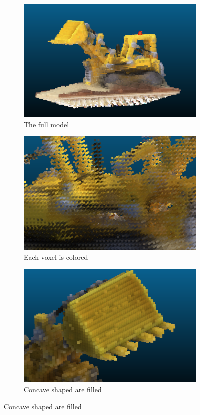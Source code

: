 \documentclass{article}
\begin{document}
\begin{figure}[!h]
 \centering
\begin{subfigure}{.32\textwidth}
  \centering
  \includegraphics[width=\linewidth]{figs/carve/legod1.png}   \caption{\label{fig:legod1} The full model}
\end{subfigure}
\begin{subfigure}{.32\textwidth}
  \centering
  \includegraphics[width=\linewidth]{figs/carve/legod2.png}   \caption{\label{fig:legod2} Each voxel is colored }
\end{subfigure}
\begin{subfigure}{.32\textwidth}
  \centering
  \includegraphics[width=\linewidth]{figs/carve/legod3.png}   \caption{\label{fig:legod3}  Concave shaped are filled}

\end{subfigure}
\end{figure}
\end{document}
